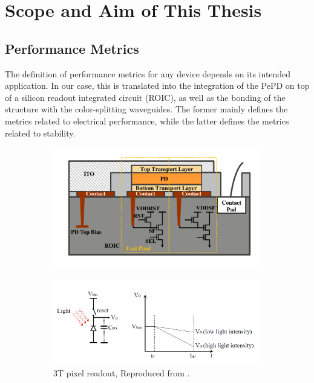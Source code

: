 \section{Scope and Aim of This Thesis}

\subsection{Performance Metrics}

The definition of performance metrics for any device depends on its intended application. In our case, this is translated into the integration of the PePD on top of a silicon readout integrated circuit (ROIC), as well as the bonding of the structure with the color-splitting waveguides. The former mainly defines the metrics related to electrical performance, while the latter defines the metrics related to stability. 


\begin{figure}[htbp]
    \centering
    \begin{subfigure}[t]{0.55\textwidth} %
        \centering
        \includegraphics[width=\textwidth]{chapters/introduction/image/imager_cross_section.pdf} %
        \caption{}
        \label{}
    \end{subfigure}
    \hfill %
    \begin{subfigure}[t]{0.99\textwidth} %
        \centering
        \includegraphics[width=\textwidth]{chapters/introduction/image/3T_pixel_readout.png} %
        \caption{3T pixel readout, Reproduced from \cite{Pejovic2023ColloidalInfrared}.}
        \label{}
    \end{subfigure}

    \caption{}
    \label{fig:ch1:cmos_roic}
\end{figure}



